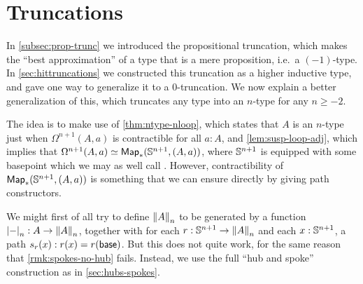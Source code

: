 

\section{Truncations}
\label{sec:truncations}

In \autoref{subsec:prop-trunc} we introduced the propositional truncation, which makes the ``best approximation'' of a type that is a mere
proposition, i.e.\ a $(-1)$-type.
In \autoref{sec:hittruncations} we constructed this truncation as a higher inductive type, and gave one way to generalize it to a
0-truncation.
We now explain a better generalization of this, which truncates any type into an $n$-type for any $n\geq -2$.

The idea is to make use of \autoref{thm:ntype-nloop}, which states that $A$ is an $n$-type just when $\Omega^{n+1}(A,a)$ is contractible for
all $a:A$, and \autoref{lem:susp-loop-adj}, which implies that $\Omega^{n+1}(A,a) \simeq \Map_*(\Sn^{n+1},(A,a))$, where $\Sn^{n+1}$ is
equipped with some basepoint which we may as well call \base.
However, contractibility of $\Map_*(\Sn^{n+1},(A,a))$ is something that we can ensure directly by giving path constructors.

We might first of all try to define $\trunc nA$ to be generated by a function $\tproj n- : A \to \trunc n A$, together with for each
$r:\Sn^{n+1} \to \trunc n A$ and each $x:\Sn^{n+1}$, a path $s_r(x):r(x) = r(\base)$.
%
But this does not quite work, for the same reason that \autoref{rmk:spokes-no-hub} fails.
Instead, we use the full ``hub and spoke'' construction as in \autoref{sec:hubs-spokes}.

